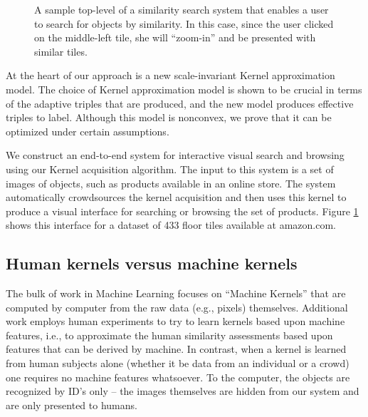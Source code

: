 \documentclass{article}
\begin{document}
\begin{figure}
 \caption{\label{fig:tilestree} A sample top-level of a similarity search system that enables a user to search for objects by similarity.  In this case, since the user clicked on the middle-left tile, she will ``zoom-in'' and be presented with similar tiles.}
\end{figure}

At the heart of our approach is a new scale-invariant Kernel approximation model.  The choice of Kernel approximation model is shown to be crucial in terms of the adaptive triples that are produced, and the new model produces effective triples to label.  Although this model is nonconvex, we prove that it can be optimized under certain assumptions.  

We construct an end-to-end system for interactive visual search and
browsing using our Kernel acquisition algorithm. The input to this
system is a set of images of objects, such as products available in an
online store. The system automatically crowdsources the kernel
acquisition and then uses this kernel to produce a visual interface
for searching or browsing the set of products. Figure
\ref{fig:tilestree} shows this interface for a dataset of 433 floor
tiles available at amazon.com.

\subsection{Human kernels versus machine kernels}
The bulk of work in Machine Learning focuses on ``Machine Kernels''
that are computed by computer from the raw data (e.g., pixels)
themselves.  Additional work employs human experiments to try to learn
kernels based upon machine features, i.e., to approximate the human
similarity assessments based upon features that can be derived by
machine.  In contrast, when a kernel is learned from human subjects
alone (whether it be data from an individual or a crowd) one requires
no machine features whatsoever. To the computer, the objects
are recognized by ID's only -- the images themselves are hidden from
our system and are only presented to humans.
\end{document}
